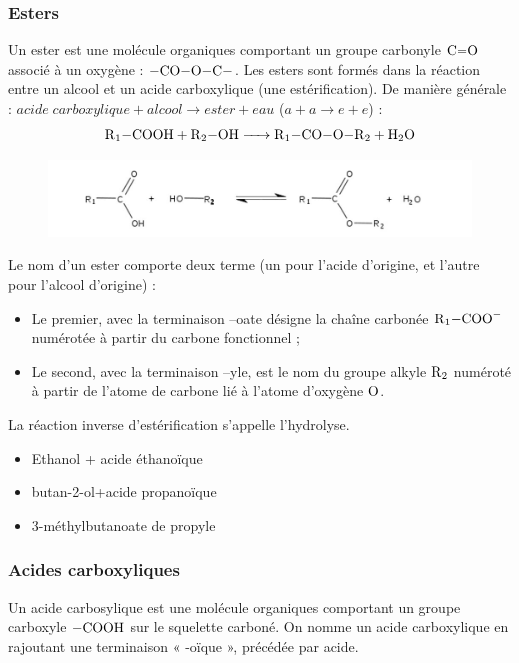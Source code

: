 \documentclass[11pt,a4paper]{article}
\begin{document}
\subsubsection*{Esters}
Un ester est une molécule organiques comportant un groupe carbonyle $\ce{C=O}$ associé à un oxygène : $\ce{-CO-O-C-}$. Les esters sont formés dans la réaction entre un alcool et un acide carboxylique (une estérification). De manière générale : $acide\; carboxylique+alcool\rightarrow ester+eau$ ($a+a\rightarrow e+e$) : 
\[ \ce{R1-COOH + R2-OH -> R1-CO-O-R2 + H2O}  \]
\begin{figure}[h]
    \centering
    \includegraphics[width=\linewidth]{imgs/c5/esterific.jpg}
\end{figure}

Le nom d'un ester comporte deux terme (un pour l'acide d'origine, et l'autre pour l'alcool d'origine) :
\begin{itemize}
    \item Le premier, avec la terminaison –oate désigne la chaîne carbonée $\ce{R_1-COO-}$ numérotée à partir du carbone fonctionnel ;
    \item Le second, avec la terminaison –yle, est le nom du groupe alkyle $\ce{R_2}$  numéroté à partir de l’atome de carbone lié à l’atome d’oxygène $\ce{O}$. 
\end{itemize}
La réaction inverse d'estérification s'appelle l'hydrolyse. 

\begin{eg}
\begin{itemize}
    \item Ethanol + acide éthanoïque
\vspace{1cm}
	\item butan-2-ol+acide propanoïque
\vspace{1cm}
    \item 3-méthylbutanoate de propyle
\vspace{1cm}
\end{itemize}
\end{eg}


\subsubsection*{Acides carboxyliques}
Un acide carbosylique est une molécule organiques comportant un groupe carboxyle $\ce{-COOH}$ sur le squelette carboné. On nomme un acide carboxylique en rajoutant une terminaison « -oïque », précédée par acide. 
\end{document}
